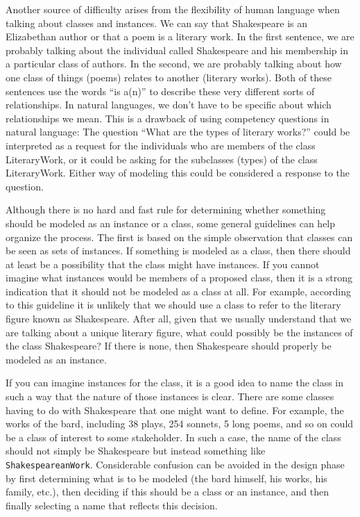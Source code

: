 Another source of difficulty arises from the flexibility of human
language when talking about
classes and instances. We can say that Shakespeare is an Elizabethan
author or that a poem is a literary work. In the first sentence, we are
probably talking about the individual called Shakespeare and his
membership in a particular class of authors. In the second, we are
probably talking about how one class of things (poems) relates to
another (literary works). Both of these sentences use the words ``is
a(n)'' to describe these very different sorts of relationships. In
natural languages, we don't have to be specific about which
relationships we mean. This is a drawback of using competency questions
in natural language: The question ``What are the types of literary
works?'' could be interpreted as a request for the individuals who are
members of the class LiteraryWork, or it could be asking for the
subclasses (types) of the class LiteraryWork. Either way of modeling
this could be considered a response to the question.

Although there is no hard and fast rule for determining whether
something should be modeled as an instance or a class, some general
guidelines can help organize the process. The first is based on the
simple observation that classes can be seen as sets of instances. If
something is modeled as a class, then there should at least be a
possibility that the class might have instances. If you cannot imagine
what instances would be members of a proposed class, then it is a strong
indication that it should not be modeled as a class at all. For example,
according to this guideline it is unlikely that we should use
a class to refer to the literary figure known as Shakespeare. After all,
given that we usually understand that we are talking about a unique
literary figure, what could possibly be the instances of the class
Shakespeare? If there is none, then Shakespeare should properly be
modeled as an instance.

If you can imagine instances for the class, it is a good idea to name
the class in such a way that the nature of those instances is clear.
There are some classes having to do with Shakespeare that one might want
to define. For example, the works of the bard, including 38 plays, 254
sonnets, 5 long poems, and so on could be a class of interest to some
stakeholder. In such a case, the name of the class should not simply be
Shakespeare but instead something like \texttt{ShakespeareanWork}. Considerable
confusion can be avoided in the design phase by first determining what
is to be modeled (the bard himself, his works, his family, etc.), then
deciding if this should be a class or an instance, and then finally
selecting a name that reflects this decision.

